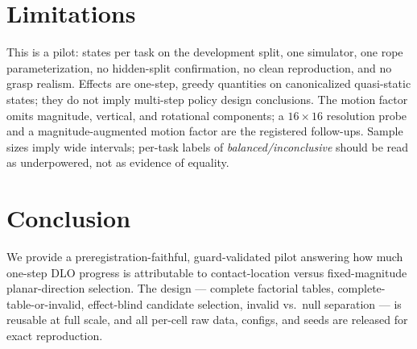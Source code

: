 \documentclass{article}
\begin{document}
\section{Limitations}
This is a pilot: \nstatespertask{} states per task on the development split,
one simulator, one rope parameterization, no hidden-split confirmation, no
clean reproduction, and no grasp realism. Effects are one-step, greedy
quantities on canonicalized quasi-static states; they do not imply multi-step
policy design conclusions. The motion factor omits magnitude, vertical, and
rotational components; a $16{\times}16$ resolution probe and a
magnitude-augmented motion factor are the registered follow-ups. Sample sizes
imply wide intervals; per-task labels of \emph{balanced/inconclusive} should
be read as underpowered, not as evidence of equality.

\section{Conclusion}
We provide a preregistration-faithful, guard-validated pilot answering how
much one-step DLO progress is attributable to contact-location versus
fixed-magnitude planar-direction selection. The design --- complete factorial
tables, complete-table-or-invalid, effect-blind candidate selection, invalid
vs.\ null separation --- is reusable at full scale, and all per-cell raw data,
configs, and seeds are released for exact reproduction.



\end{document}
